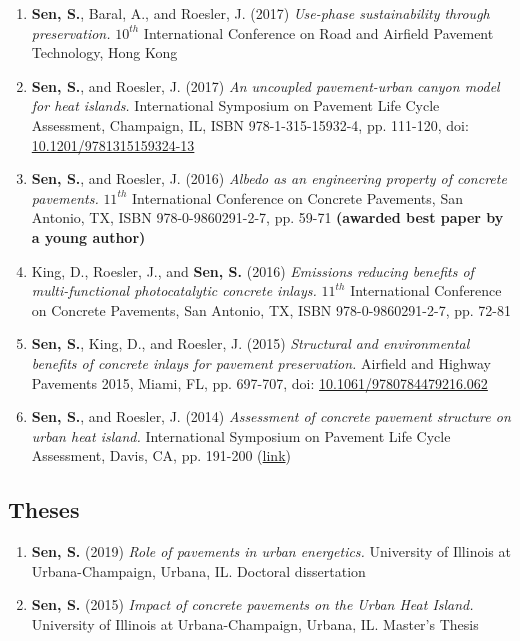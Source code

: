 \documentclass[12pt]{article}
\begin{document}
\begin{enumerate}[label=(C\arabic*)]
	\item \textbf{Sen, S.}, Baral, A., and Roesler, J. (2017) \textit{Use-phase sustainability through preservation.} $10^{th}$ International Conference on Road and Airfield Pavement Technology, Hong Kong
	\item \textbf{Sen, S.}, and Roesler, J. (2017) \textit{An uncoupled pavement-urban canyon model for heat islands.} International Symposium on Pavement Life Cycle Assessment, Champaign, IL, ISBN 978-1-315-15932-4, pp. 111-120, doi: \href{http://dx.doi.org/10.1201/9781315159324-13}{10.1201/9781315159324-13}
	\item \textbf{Sen, S.}, and Roesler, J. (2016) \textit{Albedo as an engineering property of concrete pavements.} $11^{th}$ International Conference on Concrete Pavements, San Antonio, TX, ISBN 978-0-9860291-2-7, pp. 59-71 \textbf{(awarded best paper by a young author)}
	\item King, D., Roesler, J., and \textbf{Sen, S.} (2016) \textit{Emissions reducing benefits of multi-functional photocatalytic concrete inlays.} $11^{th}$ International Conference on Concrete Pavements, San Antonio, TX, ISBN 978-0-9860291-2-7, pp. 72-81
	\item \textbf{Sen, S.}, King, D., and Roesler, J. (2015) \textit{Structural and environmental benefits of concrete inlays for pavement preservation.} Airfield and Highway Pavements 2015, Miami, FL, pp. 697-707, doi: \href{http://dx.doi.org/10.1061/9780784479216.062}{10.1061/9780784479216.062}
	\item \textbf{Sen, S.}, and Roesler, J. (2014) \textit{Assessment of concrete pavement structure on urban heat island.} International Symposium on Pavement Life Cycle Assessment, Davis, CA, pp. 191-200 (\href{http://www.ucprc.ucdavis.edu/p-LCA2014/media/pdf/Papers/LCA14_Urban\%20Heat\%20Island.pdf}{link})
\end{enumerate}

\subsection*{Theses}
\begin{enumerate}[label=(T\arabic*)]
	\item \textbf{Sen, S.} (2019) \textit{Role of pavements in urban energetics.} University of Illinois at Urbana-Champaign, Urbana, IL. Doctoral dissertation
	\item \textbf{Sen, S.} (2015) \textit{Impact of concrete pavements on the 		Urban Heat Island.} University of Illinois at Urbana-Champaign, Urbana, IL. Master’s Thesis
\end{enumerate}
\end{document}
